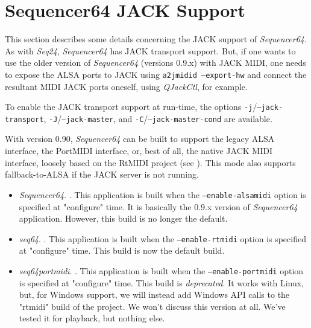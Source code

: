 %
%
%

\section{Sequencer64 JACK Support}
\label{sec:seq64_jack}

   This section describes some details concerning the JACK support of
   \textsl{Sequencer64}.
   As with \textsl{Seq24}, \textsl{Sequencer64} has JACK transport support.
   But, if one wants to use the older version of \textsl{Sequencer64} (versions
   0.9.x) with JACK MIDI, one needs to expose the ALSA ports to JACK using
   \texttt{a2jmidid --export-hw} and connect the resultant MIDI JACK ports
   oneself, using \textsl{QJackCtl}, for example.

   To enable the JACK transport support at run-time, the options
   \texttt{-j}/\texttt{--jack-transport}, \texttt{-J}/\texttt{--jack-master},
   and \texttt{-C}/\texttt{--jack-master-cond} are available.

   With version 0.90, \textsl{Sequencer64} can be built to support the legacy
   ALSA interface, the PortMIDI interface, or, best of all, the native JACK
   MIDI interface, loosely based on the RtMIDI project
   (see \cite{rtmidi}).  This mode also supports fallback-to-ALSA if the JACK
   server is not running.

   \begin{itemize}
      \item \textsl{Sequencer64}.
         .
         This application is built when the
         \texttt{--enable-alsamidi} option is specified at "configure" time.
         It is basically the 0.9.x version of \textsl{Sequencer64} application.
         However, this build is no longer the default.
      \item \textsl{seq64}.
         .
         This application is built when the
         \texttt{--enable-rtmidi} option is specified at "configure" time.
         This build is now the default build.
      \item \textsl{seq64portmidi}.
         .
         This application is built when the
         \texttt{--enable-portmidi} option is specified at "configure" time.
         This build is \textsl{deprecated}.  It works with Linux, but, for
         Windows support, we will instead add Windows API calls to the "rtmidi"
         build of the project.  We won't discuss this version at all.  We've
         tested it for playback, but nothing else.
   \end{itemize}

